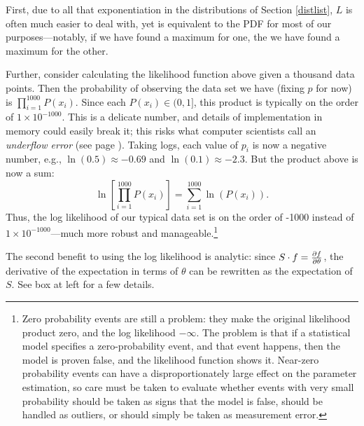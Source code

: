 First, due to all that exponentiation in the distributions
of Section \ref{distlist}, $L$ is often much easier to deal with, yet
is equivalent to the PDF for most of our purposes---notably, if we have
found a maximum for one, the we have found a maximum for the other.

\label{precisionfix}
Further, consider calculating the likelihood function above given
a thousand data points.  Then the probability of observing the data set
we have (fixing $p$ for now) is $\prod_{i=1}^{1000} P(x_i)$.  Since each
$P(x_i)\in (0,1]$, this product is typically on the order of $1\times
10^{-1000}$. This is a delicate number, and details of implementation in
memory could easily break it; this risks what computer scientists call an
{\sl underflow error} (see page \pageref{precisionproblem}). Taking logs, each value of $p_i$ is now a negative
number, e.g., $\ln(0.5)\approx -0.69$ and $\ln(0.1)\approx -2.3$.  But the
product above is now a sum: $$\ln\left[\prod_{i=1}^{1000} P(x_i)\right]
= \sum_{i=1}^{1000} \ln\left(P(x_i)\right).$$ Thus, the log likelihood of our typical
data set is on the order of -1000 instead of $1\times 10^{-1000}$---much
more robust and manageable.\footnote{Zero probability events are still
a problem: they make the original likelihood product zero, and the log
likelihood $-\infty$. The problem is that if a statistical model
specifies a zero-probability event, and that event happens, then the
model is proven false, and the likelihood function shows it. Near-zero
probability events can have a disproportionately large effect on the
parameter estimation, so care must be taken to evaluate whether events with very
small probability should be taken as signs that the model is false,
should be handled as outliers, or should simply be taken as 
measurement error.}

The second benefit to using the log likelihood is analytic: since $S \cdot
f = {\partial f \over \partial \theta}$, the derivative of the expectation
in terms of $\theta$ can be rewritten as the expectation of $S$. See box
at left for a few details.

